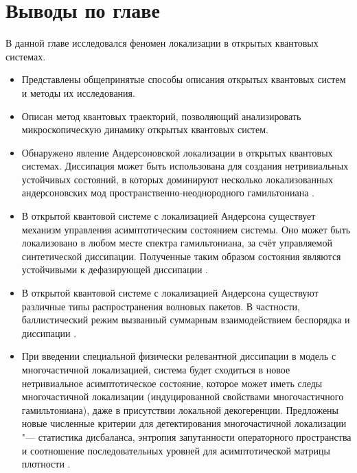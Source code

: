 \section{Выводы по главе}\label{sec:ch1/results}
В данной главе исследовался феномен локализации в открытых квантовых системах.
\begin{itemize}[beginpenalty=10000] %
	\item Представлены общепринятые способы описания открытых квантовых систем и методы их исследования.
	\item Описан метод квантовых траекторий, позволяющий анализировать микроскопическую динамику открытых квантовых систем. 
	\item Обнаружено явление Андерсоновской локализации в открытых квантовых системах. Диссипация может быть использована для создания нетривиальных устойчивых состояний, в которых доминируют несколько локализованных андерсоновских мод пространственно-неоднородного гамильтониана \cite{Yusipov2017}.
	\item В открытой квантовой системе с локализацией Андерсона существует механизм управления асимптотическим состоянием системы. Оно может быть локализовано в любом месте спектра гамильтониана, за счёт управляемой синтетической диссипации. Полученные таким образом состояния являются устойчивыми к дефазирующей диссипации \cite{Vershinina2017}.
	\item В открытой квантовой системе с локализацией Андерсона существуют различные типы распространения волновых пакетов. В частности, баллистический режим вызванный суммарным взаимодействием беспорядка и диссипации \cite{Yusipov2018}. 
	\item При введении специальной физически релевантной диссипации в модель с многочастичной локализацией, система будет сходиться в новое нетривиальное асимптотическое состояние, которое может иметь следы многочастичной локализации (индуцированной свойствами многочастичного гамильтониана), даже в присутствии локальной декогеренции. Предложены новые численные критерии для детектирования многочастичной локализации "--- статистика дисбаланса, энтропия запутанности операторного пространства и соотношение последовательных уровней для асимптотической матрицы плотности \cite{Vakulchyk2018}.
\end{itemize}



